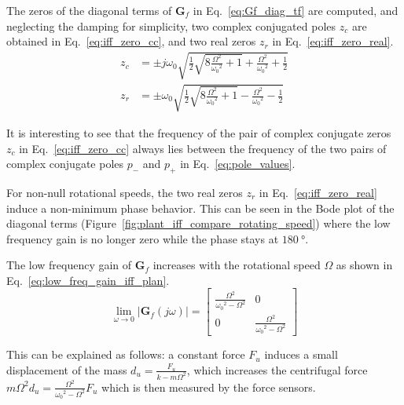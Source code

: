 \documentclass[10pt]{iopart}
\begin{document}
The zeros of the diagonal terms of \(\mathbf{G}_f\) in Eq.~\eqref{eq:Gf_diag_tf} are computed, and neglecting the damping for simplicity, two complex conjugated poles \(z_{c}\) are obtained in Eq.~\eqref{eq:iff_zero_cc}, and two real zeros \(z_{r}\) in Eq.~\eqref{eq:iff_zero_real}.
\begin{subequations}
  \begin{align}
    z_c &= \pm j \omega_0 \sqrt{\frac{1}{2} \sqrt{8 \frac{\Omega^2}{{\omega_0}^2} + 1} + \frac{\Omega^2}{{\omega_0}^2} + \frac{1}{2} } \label{eq:iff_zero_cc} \\
    z_r &= \pm   \omega_0 \sqrt{\frac{1}{2} \sqrt{8 \frac{\Omega^2}{{\omega_0}^2} + 1} - \frac{\Omega^2}{{\omega_0}^2} - \frac{1}{2} } \label{eq:iff_zero_real}
  \end{align}
\end{subequations}

It is interesting to see that the frequency of the pair of complex conjugate zeros \(z_c\) in Eq.~\eqref{eq:iff_zero_cc} always lies between the frequency of the two pairs of complex conjugate poles \(p_{-}\) and \(p_{+}\) in Eq.~\eqref{eq:pole_values}.

For non-null rotational speeds, the two real zeros \(z_r\) in Eq.~\eqref{eq:iff_zero_real} induce a non-minimum phase behavior.
This can be seen in the Bode plot of the diagonal terms (Figure~\ref{fig:plant_iff_compare_rotating_speed}) where the low frequency gain is no longer zero while the phase stays at \(\SI{180}{\degree}\).

The low frequency gain of \(\mathbf{G}_f\) increases with the rotational speed \(\Omega\) as shown in Eq.~\eqref{eq:low_freq_gain_iff_plan}.
\begin{equation}
\label{eq:low_freq_gain_iff_plan}
  \lim_{\omega \to 0} \left| \mathbf{G}_f (j\omega) \right| = \begin{bmatrix}
  \frac{\Omega^2}{{\omega_0}^2 - \Omega^2} & 0 \\
  0  & \frac{\Omega^2}{{\omega_0}^2 - \Omega^2}
\end{bmatrix}
\end{equation}

This can be explained as follows: a constant force \(F_u\) induces a small displacement of the mass \(d_u = \frac{F_u}{k - m\Omega^2}\), which increases the centrifugal force \(m\Omega^2d_u = \frac{\Omega^2}{{\omega_0}^2 - \Omega^2} F_u\) which is then measured by the force sensors.
\end{document}
